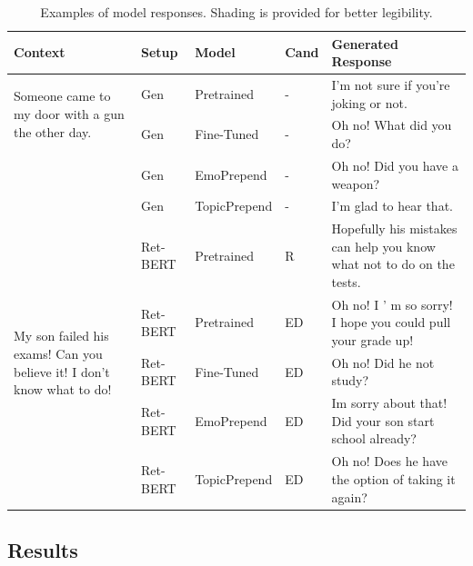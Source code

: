 \documentclass[11pt,a4paper]{article}
\newcommand\basename{Fine-Tuned}
\begin{document}
\begin{table}[tb]
\begin{center}
\begin{tabular}{p{2.5cm}lllp{6cm}}
\toprule

Context & Setup&Model&Cand & Generated Response \\ \midrule
\multirow{2}{2.4cm}{Someone came to my door with a gun the other day.} &
\cellcolor{LightGray}Gen&\cellcolor{LightGray}Pretrained&\cellcolor{LightGray}- &\cellcolor{LightGray}I'm not sure if you're joking or not.\\
 &\cellcolor{Gray}Gen&\cellcolor{Gray}\basename{}&\cellcolor{Gray}- &\cellcolor{Gray}Oh no! What did you do?\\
 &\cellcolor{LightGray}Gen&\cellcolor{LightGray}EmoPrepend&\cellcolor{LightGray}-&\cellcolor{LightGray}Oh no! Did you have a weapon?\\
 &\cellcolor{Gray}Gen&\cellcolor{Gray}TopicPrepend&\cellcolor{Gray}-&\cellcolor{Gray}I'm glad to hear that.\\
\midrule

\multirow{9}{2.4cm}{My son failed his exams! Can you believe it! I don't know what to do!}&\cellcolor{LightGray}Ret-BERT&\cellcolor{LightGray}Pretrained&\cellcolor{LightGray}R &\cellcolor{LightGray}Hopefully his mistakes can help you know what not to do on the tests.\\ 
&\cellcolor{Gray}Ret-BERT&\cellcolor{Gray}Pretrained&\cellcolor{Gray}ED &\cellcolor{Gray}Oh no! I ' m so sorry! I hope you could pull your grade up!\\




&\cellcolor{LightGray}Ret-BERT&\cellcolor{LightGray}\basename{}&\cellcolor{LightGray}ED &\cellcolor{LightGray}Oh no! Did he not study? \\
&\cellcolor{Gray}Ret-BERT&\cellcolor{Gray}EmoPrepend&\cellcolor{Gray}ED &\cellcolor{Gray}Im sorry about that! Did your son start school already?\\
&\cellcolor{LightGray}Ret-BERT&\cellcolor{LightGray}TopicPrepend&\cellcolor{LightGray}ED &\cellcolor{LightGray}Oh no! Does he have the option of taking it again? \\
\bottomrule
\end{tabular}
\end{center}
\caption{Examples of model responses. Shading is provided for better legibility.
}
\label{table:modelout}
\end{table}
\subsection{Results}
\end{document}
